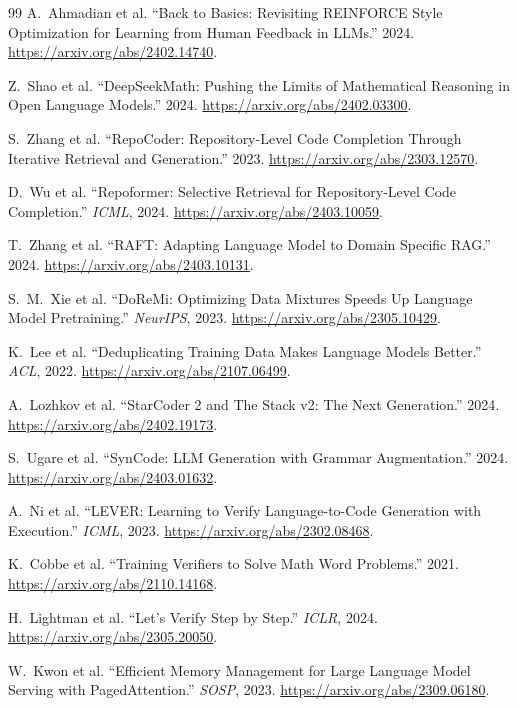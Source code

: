 \documentclass[10pt,letterpaper]{article}
\newcommand{\1}{\mathbb{1}}
\begin{document}
\begin{thebibliography}{99}
A.~Ahmadian et al. ``Back to Basics: Revisiting REINFORCE Style Optimization for Learning from Human
Feedback in LLMs.'' 2024. \url{https://arxiv.org/abs/2402.14740}.

Z.~Shao et al. ``DeepSeekMath: Pushing the Limits of Mathematical Reasoning in Open Language Models.''
2024. \url{https://arxiv.org/abs/2402.03300}.

S.~Zhang et al. ``RepoCoder: Repository-Level Code Completion Through Iterative Retrieval and
Generation.'' 2023. \url{https://arxiv.org/abs/2303.12570}.

D.~Wu et al. ``Repoformer: Selective Retrieval for Repository-Level Code Completion.''
\emph{ICML}, 2024. \url{https://arxiv.org/abs/2403.10059}.

T.~Zhang et al. ``RAFT: Adapting Language Model to Domain Specific RAG.'' 2024.
\url{https://arxiv.org/abs/2403.10131}.

S.~M.~Xie et al. ``DoReMi: Optimizing Data Mixtures Speeds Up Language Model Pretraining.''
\emph{NeurIPS}, 2023. \url{https://arxiv.org/abs/2305.10429}.

K.~Lee et al. ``Deduplicating Training Data Makes Language Models Better.'' \emph{ACL}, 2022.
\url{https://arxiv.org/abs/2107.06499}.

A.~Lozhkov et al. ``StarCoder 2 and The Stack v2: The Next Generation.'' 2024.
\url{https://arxiv.org/abs/2402.19173}.

S.~Ugare et al. ``SynCode: LLM Generation with Grammar Augmentation.'' 2024.
\url{https://arxiv.org/abs/2403.01632}.

A.~Ni et al. ``LEVER: Learning to Verify Language-to-Code Generation with Execution.''
\emph{ICML}, 2023. \url{https://arxiv.org/abs/2302.08468}.

K.~Cobbe et al. ``Training Verifiers to Solve Math Word Problems.'' 2021.
\url{https://arxiv.org/abs/2110.14168}.

H.~Lightman et al. ``Let's Verify Step by Step.'' \emph{ICLR}, 2024.
\url{https://arxiv.org/abs/2305.20050}.

W.~Kwon et al. ``Efficient Memory Management for Large Language Model Serving with PagedAttention.''
\emph{SOSP}, 2023. \url{https://arxiv.org/abs/2309.06180}.


\end{thebibliography}
\end{document}
